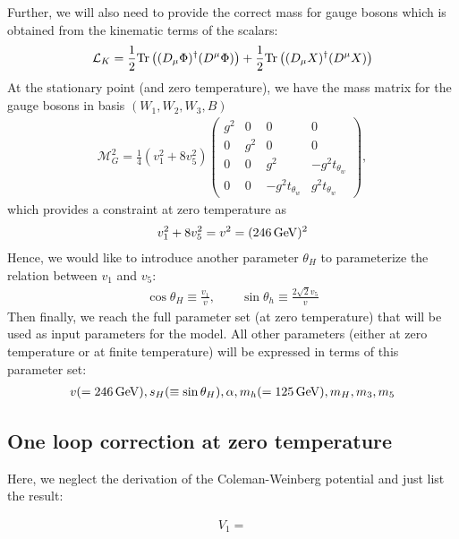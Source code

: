 \documentclass[12pt]{article}
\begin{document}
Further, we will also need to provide the correct mass for gauge bosons which is obtained from the kinematic terms of the scalars:
\begin{align}
\mathcal{L}_K = \frac{1}{2}{\rm Tr}\left((D_\mu\Phi)^\dagger(D^\mu\Phi)\right) + \frac{1}{2}{\rm Tr}\left((D_\mu X)^\dagger (D^\mu X)\right)
\end{align}
At the stationary point (and zero temperature), we have the mass matrix for the gauge bosons in basis $(W_1,W_2,W_3,B)$
\begin{align}
    \mathcal{M}_G^2 = \frac{1}{4}(v_1^2+8v_5^2)\begin{pmatrix}
        g^2 & 0 & 0 & 0 \\
        0 & g^2 & 0 & 0 \\
        0 & 0 & g^2 & -g^2t_{\theta_w} \\
        0 & 0 & -g^2t_{\theta_w} & g^2t_{\theta_w}
    \end{pmatrix},
\end{align}
which provides a constraint at zero temperature as
\begin{align}
    v_1^2 + 8v_5^2 = v^2 = (246\,{\rm GeV})^2
\end{align}
Hence, we would like to introduce another parameter $\theta_H$ to parameterize the relation between $v_1$ and $v_5$:
\begin{align}
    \cos\theta_H \equiv \frac{v_1}{v},\qquad  \sin\theta_h \equiv \frac{2\sqrt{2}v_5}{v}
\end{align}
Then finally, we reach the full parameter set (at zero temperature) that will be used as input parameters for the model. All other parameters (either at zero temperature or at finite temperature) will be expressed in terms of this parameter set:
\begin{align}
    v(=246\,{\rm GeV}), s_H(\equiv \sin\theta_H), \alpha, m_h(=125\,{\rm GeV}), m_H, m_3, m_5
\end{align}

\subsection{One loop correction at zero temperature}

Here, we neglect the derivation of the Coleman-Weinberg potential and just list the result:

\begin{align}
    V_1 =
\end{align}




\end{document}
